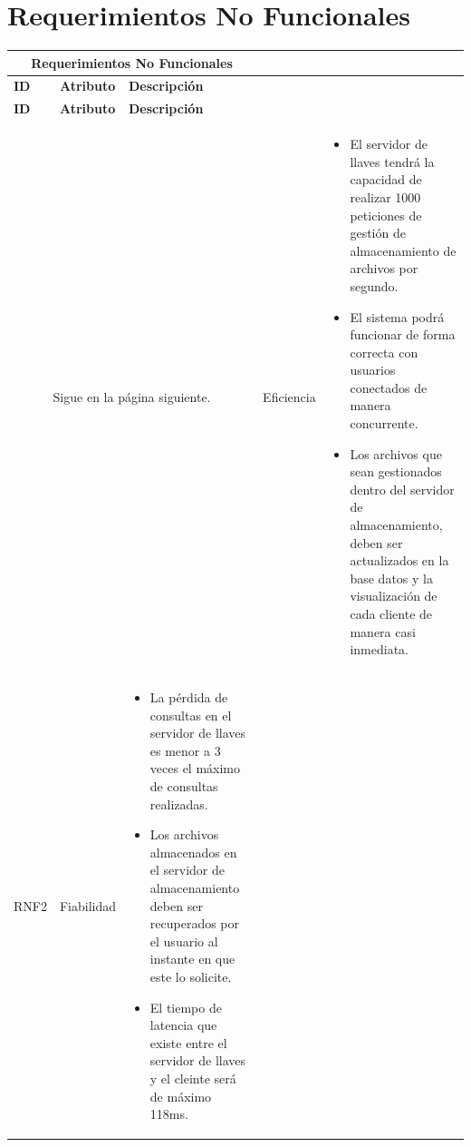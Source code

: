 \section{Requerimientos No Funcionales }
\begin{longtable}{| p{1.5cm} | p{3cm} | p{11cm} |}

\hline
\multicolumn{3}{|c|}{\textbf{Requerimientos No Funcionales}} \\ \hline
\textbf{ID} &  \textbf{Atributo} & \textbf{Descripción}\\
\hline \hline
\endfirsthead

\hline
\textbf{ID} &  \textbf{Atributo} & \textbf{Descripción}\\
\hline \hline
\endhead

\multicolumn{3}{|c|}{Sigue en la página siguiente.}
\endfoot

\endlastfoot

RNF1 & Eficiencia &  \begin{itemize} 
   \item El servidor de llaves tendrá la capacidad de realizar 1000 peticiones de gestión de almacenamiento de archivos por segundo. 
   \item El sistema podrá funcionar de forma correcta con usuarios conectados de manera concurrente. 
   \item Los archivos que sean gestionados dentro del servidor de almacenamiento, deben ser actualizados en la base datos y la visualización de cada cliente de manera casi inmediata. 
  \end{itemize}
\\ \hline

RNF2 & Fiabilidad &  \begin{itemize} 
  \item La pérdida de consultas en el servidor de llaves es menor a 3 veces el máximo de consultas realizadas. 
   \item Los archivos almacenados en el servidor de almacenamiento deben ser recuperados por el usuario al instante en que este lo solicite. 
   \item El tiempo de latencia que existe entre el servidor de llaves y el cleinte será de máximo 118ms. 
 \end{itemize}
\\ \hline


\end{longtable}
